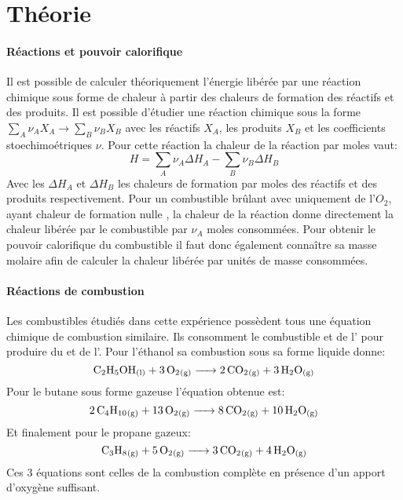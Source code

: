 \section{Théorie}


\paragraph*{Réactions et pouvoir calorifique}
Il est possible de calculer théoriquement l'énergie libérée par une réaction chimique sous forme de chaleur à partir des chaleurs de formation des réactifs et des produits. Il est possible d'étudier une réaction chimique sous la forme \(\sum_{A} \nu_A X_A \to \sum_{B} \nu_B X_B\) avec les réactifs \(X_A\), les produits \(X_B\) et les coefficients stoechimoétriques \(\nu\). Pour cette réaction la chaleur de la réaction par moles vaut:
\begin{equation}
    H = \sum_{A} \nu_A \Delta H_A - \sum_{B} \nu_B \Delta H_B
    \label{eq:chaleur_réaction}
\end{equation}
Avec les \(\Delta H_A\) et \(\Delta H_B\) les chaleurs de formation par moles des réactifs et des produits respectivement. Pour un combustible brûlant avec uniquement de l'\(O_2\), ayant chaleur de formation nulle \cite{notice}, la chaleur de la réaction donne directement la chaleur libérée par le combustible par \(\nu_A\) moles consommées. Pour obtenir le pouvoir calorifique du combustible il faut donc également connaître sa masse molaire afin de calculer la chaleur libérée par unités de masse consommées.

\paragraph*{Réactions de combustion}
Les combustibles étudiés dans cette expérience possèdent tous une équation chimique de combustion similaire. Ils consomment le combustible et de l' pour produire du  et de l'. Pour l'éthanol  sa combustion sous sa forme liquide donne:
\begin{equation}
    \ce{ C_2H_5OH_{(l)} + 3O_2_{(g)} -> 2CO_2_{(g)} + 3H_2O_{(g)} }
    \label{eq:ethanol_combustion}
\end{equation}
Pour le butane  sous forme gazeuse l'équation obtenue est:
\begin{equation}
    \ce{ 2C_4H_{10}_{(g)} + 13O_2_{(g)} -> 8CO_2_{(g)} + 10H_2O_{(g)} }
    \label{eq:butane_combustion}
\end{equation}
Et finalement pour le propane  gazeux:
\begin{equation}
    \ce{ C_3H_8_{(g)} + 5O_2_{(g)} -> 3CO_2_{(g)} + 4H_2O_{(g)} }
    \label{eq:propane_combustion}
\end{equation}
Ces 3 équations sont celles de la combustion complète en présence d'un apport d'oxygène suffisant.
